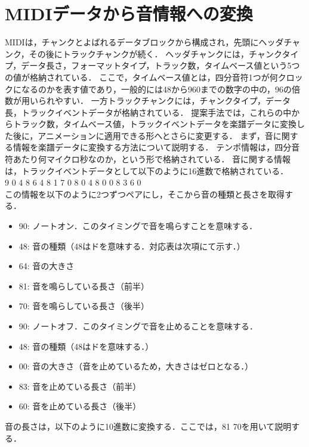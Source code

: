 \section{MIDIデータから音情報への変換} \label{sec:analysis}
MIDIは，チャンクとよばれるデータブロックから構成され，先頭にヘッダチャンク，その後にトラックチャンクが続く．
ヘッダチャンクには，チャンクタイプ，データ長さ，フォーマットタイプ，トラック数，タイムベース値という5つの値が格納されている．
ここで，タイムベース値とは，四分音符1つが何クロックになるのかを表す値であり，一般的には48から960までの数字の中の，96の倍数が用いられやすい．
一方トラックチャンクには，チャンクタイプ，データ長，トラックイベントデータが格納されている．
提案手法では，これらの中からトラック数，タイムベース値，トラックイベントデータを楽譜データに変換した後に，アニメーションに適用できる形へとさらに変更する．
\indent
まず，音に関する情報を楽譜データに変換する方法について説明する．
テンポ情報は，四分音符あたり何マイクロ秒なのか，という形で格納されている．
音に関する情報は，トラックイベントデータとして以下のように16進数で格納されている．\\

\hspace{10mm}9 0 4 8 6 4 8 1 7 0 8 0 4 8 0 0 8 3 6 0\\

この情報を以下のように2つずつペアにし，そこから音の種類と長さを取得する．\\

\begin{itemize}
	\item 90: ノートオン．このタイミングで音を鳴らすことを意味する．
	\item 48: 音の種類（48はドを意味する．対応表は次項にて示す．）
	\item 64: 音の大きさ
	\item 81: 音を鳴らしている長さ（前半）
	\item 70: 音を鳴らしている長さ（後半）
	\item 90: ノートオフ．このタイミングで音を止めることを意味する．
	\item 48: 音の種類（48はドを意味する．）
	\item 00: 音の大きさ（音を止めているため，大きさはゼロとなる．）
	\item 83: 音を止めている長さ（前半）
	\item 60: 音を止めている長さ（後半）
\end{itemize}

音の長さは，以下のように10進数に変換する．ここでは，81 70を用いて説明する．\\

